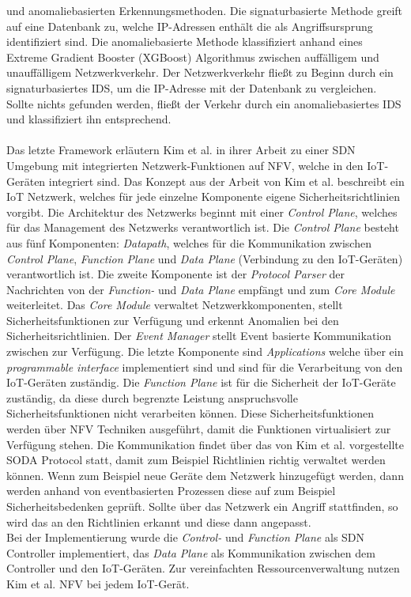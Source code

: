 und anomaliebasierten Erkennungsmethoden. Die signaturbasierte Methode greift auf eine Datenbank zu, welche IP-Adressen enthält die als Angriffsursprung identifiziert sind. Die anomaliebasierte Methode 
klassifiziert anhand eines Extreme Gradient Booster (XGBoost) Algorithmus \cite{DBLP:journals/corr/ChenG16} zwischen auffälligem und unauffälligem Netzwerkverkehr. Der Netzwerkverkehr fließt zu Beginn 
durch ein signaturbasiertes IDS, um die IP-Adresse mit der Datenbank zu vergleichen. Sollte nichts gefunden werden, fließt der Verkehr durch ein anomaliebasiertes IDS und klassifiziert ihn entsprechend.
\\ \\ Das letzte Framework erläutern Kim et al. \cite{DBLP:journals/cn/KimNPSS19} in ihrer Arbeit zu einer SDN Umgebung mit integrierten Netzwerk-Funktionen auf NFV, welche in den IoT-Geräten integriert
sind. Das Konzept aus der Arbeit von Kim et al. beschreibt ein IoT Netzwerk, welches für jede einzelne Komponente eigene Sicherheitsrichtlinien vorgibt. Die Architektur des Netzwerks beginnt mit einer
\textit{Control Plane}, welches für das Management des Netzwerks verantwortlich ist. Die \textit{Control Plane} besteht aus fünf Komponenten: \textit{Datapath}, welches für die Kommunikation zwischen 
\textit{Control Plane}, \textit{Function Plane} und \textit{Data Plane} (Verbindung zu den IoT-Geräten) verantwortlich ist. Die zweite Komponente ist der \textit{Protocol Parser} der Nachrichten von der 
\textit{Function-} und \textit{Data Plane} empfängt und zum \textit{Core Module} weiterleitet. Das \textit{Core Module} verwaltet Netzwerkkomponenten, stellt 
Sicherheitsfunktionen zur Verfügung und erkennt Anomalien bei den Sicherheitsrichtlinien. Der \textit{Event Manager} stellt Event basierte Kommunikation zwischen zur Verfügung. Die letzte Komponente sind 
\textit{Applications} welche über ein \textit{programmable interface} implementiert sind und sind für die Verarbeitung von den IoT-Geräten zuständig. Die \textit{Function Plane} ist für die Sicherheit der 
IoT-Geräte zuständig, da diese durch begrenzte Leistung anspruchsvolle Sicherheitsfunktionen nicht verarbeiten können. Diese Sicherheitsfunktionen werden über NFV Techniken ausgeführt, damit die Funktionen 
virtualisiert zur Verfügung stehen. Die Kommunikation findet über das von Kim et al. vorgestellte SODA Protocol statt, damit zum Beispiel Richtlinien richtig verwaltet werden können. Wenn zum Beispiel neue 
Geräte dem Netzwerk hinzugefügt werden, dann werden anhand von eventbasierten Prozessen diese auf zum Beispiel Sicherheitsbedenken geprüft. Sollte über das Netzwerk ein Angriff stattfinden, so wird das an 
den Richtlinien erkannt und diese dann angepasst. \\ Bei der Implementierung wurde die \textit{Control-} und \textit{Function Plane} als SDN Controller implementiert, das \textit{Data Plane} als Kommunikation 
zwischen dem Controller und den IoT-Geräten. Zur vereinfachten Ressourcenverwaltung nutzen Kim et al. NFV bei jedem IoT-Gerät.

